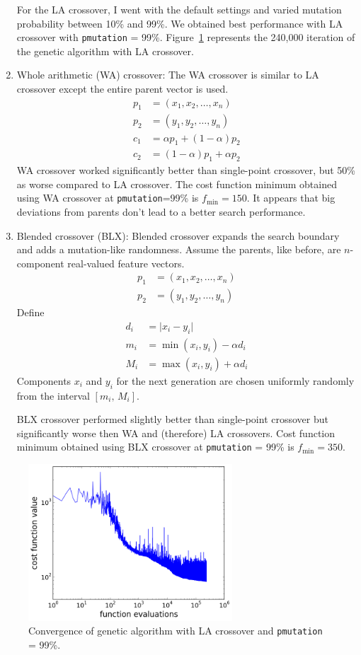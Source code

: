 \documentclass[10pt,letterpaper]{article}
\begin{document}
\begin{enumerate}
For the LA crossover, I went with the default settings and varied mutation probability between 10\% and 99\%. We obtained best performance with LA crossover with {\tt pmutation} = 99\%. Figure~\ref{gal} represents the 240,000 iteration of the genetic algorithm with LA crossover.   
\item Whole arithmetic (WA) crossover: 
 The WA crossover is similar to LA crossover except the entire parent vector is used.
\begin{align}
    p_1 &= (x_1, x_2, \ldots, x_n) \nonumber \\
    p_2 &= (y_1, y_2, \ldots, y_n) \nonumber \\
    c_1 &= \alpha p_1 + (1-\alpha)p_2 \nonumber \\
    c_2 &= (1-\alpha) p_1 + \alpha p_2
\end{align} 
WA crossover worked significantly better than single-point crossover, but 50\% as worse compared to LA crossover. The cost function minimum obtained using WA crossover at {\tt pmutation}=99\% is $f_{\text{min}}=150$. It appears that big deviations from parents don't lead to a better search performance. 
\item Blended crossover (BLX):
 Blended crossover expands the search boundary and adds a mutation-like randomness. Assume the parents, like before, are $n$-component real-valued feature vectors. 
\begin{align}
    p_1 &= (x_1, x_2, \ldots, x_n) \nonumber \\
    p_2 &= (y_1, y_2, \ldots, y_n) \nonumber
\end{align}  
Define 
\begin{align*}
d_i &= \vert x_i -y_i \vert  \\
m_i &= \min(x_i, y_i) -\alpha d_i \\
M_i &= \max(x_i, y_i) +\alpha d_i 
\end{align*}
Components $x_i$ and $y_i$ for the next generation are chosen uniformly randomly from the interval $[m_i,\, M_i]$. 

BLX crossover performed slightly better than single-point crossover but significantly worse then WA and (therefore) LA crossovers. Cost function minimum obtained using BLX crossover at {\tt pmutation} = 99\% is $f_{\text{min}}=350$.
\end{enumerate} 
\begin{figure}[htbp]
	\centering
	\includegraphics[width=3in]{../plots/geneticalgorithm.png}
	\caption{Convergence of genetic algorithm with LA crossover and {\tt pmutation} = 99\%. \label{gal}}
\end{figure}
\end{document}
